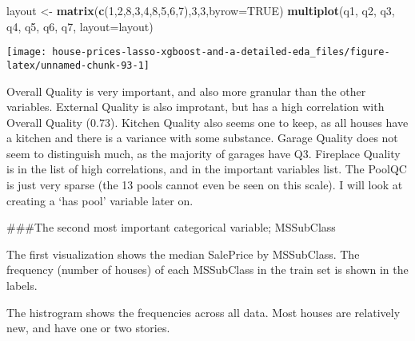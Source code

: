 \documentclass[]{article}
\newenvironment{Shaded}{\begin{snugshade}}{\end{snugshade}}
\newcommand{\DataTypeTok}[1]{\textcolor[rgb]{0.13,0.29,0.53}{#1}}
\newcommand{\DecValTok}[1]{\textcolor[rgb]{0.00,0.00,0.81}{#1}}
\newcommand{\KeywordTok}[1]{\textcolor[rgb]{0.13,0.29,0.53}{\textbf{#1}}}
\newcommand{\NormalTok}[1]{#1}
\newcommand{\OtherTok}[1]{\textcolor[rgb]{0.56,0.35,0.01}{#1}}
\newcommand{\StringTok}[1]{\textcolor[rgb]{0.31,0.60,0.02}{#1}}
\begin{document}
\begin{Shaded}
\begin{Highlighting}[]
\NormalTok{layout <-}\StringTok{ }\KeywordTok{matrix}\NormalTok{(}\KeywordTok{c}\NormalTok{(}\DecValTok{1}\NormalTok{,}\DecValTok{2}\NormalTok{,}\DecValTok{8}\NormalTok{,}\DecValTok{3}\NormalTok{,}\DecValTok{4}\NormalTok{,}\DecValTok{8}\NormalTok{,}\DecValTok{5}\NormalTok{,}\DecValTok{6}\NormalTok{,}\DecValTok{7}\NormalTok{),}\DecValTok{3}\NormalTok{,}\DecValTok{3}\NormalTok{,}\DataTypeTok{byrow=}\OtherTok{TRUE}\NormalTok{)}
\KeywordTok{multiplot}\NormalTok{(q1, q2, q3, q4, q5, q6, q7, }\DataTypeTok{layout=}\NormalTok{layout)}
\end{Highlighting}
\end{Shaded}

\texttt{[image: house-prices-lasso-xgboost-and-a-detailed-eda\_files/figure-latex/unnamed-chunk-93-1]}

Overall Quality is very important, and also more granular than the other
variables. External Quality is also improtant, but has a high
correlation with Overall Quality (0.73). Kitchen Quality also seems one
to keep, as all houses have a kitchen and there is a variance with some
substance. Garage Quality does not seem to distinguish much, as the
majority of garages have Q3. Fireplace Quality is in the list of high
correlations, and in the important variables list. The PoolQC is just
very sparse (the 13 pools cannot even be seen on this scale). I will
look at creating a `has pool' variable later on.

\#\#\#The second most important categorical variable; MSSubClass

The first visualization shows the median SalePrice by MSSubClass. The
frequency (number of houses) of each MSSubClass in the train set is
shown in the labels.

The histrogram shows the frequencies across all data. Most houses are
relatively new, and have one or two stories.
\end{document}
